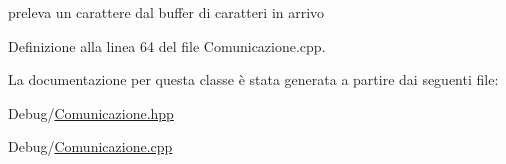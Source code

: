 preleva un carattere dal buffer di caratteri in arrivo 



Definizione alla linea 64 del file Comunicazione.\+cpp.



La documentazione per questa classe è stata generata a partire dai seguenti file\+:\begin{DoxyCompactItemize}
\item 
Debug/\hyperlink{_comunicazione_8hpp}{Comunicazione.\+hpp}\item 
Debug/\hyperlink{_comunicazione_8cpp}{Comunicazione.\+cpp}\end{DoxyCompactItemize}
